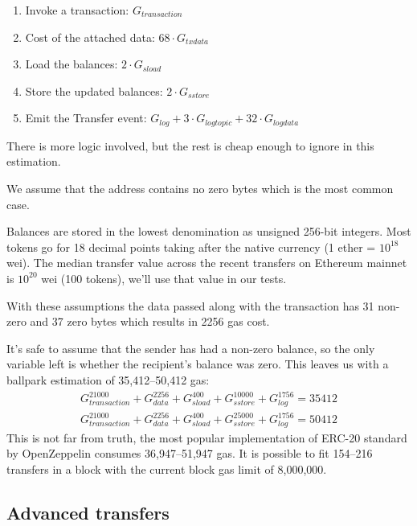 \documentclass[12pt]{article}
\begin{document}
\begin{enumerate}
	\item Invoke a transaction: $G_{transaction}$
	\item Cost of the attached data: $68 \cdot G_{txdata}$
	\item Load the balances: $2 \cdot G_{sload}$
	\item Store the updated balances: $2 \cdot G_{sstore}$
	\item Emit the Transfer event: $G_{log} + 3 \cdot G_{logtopic} + 32 \cdot G_{logdata}$
\end{enumerate}

There is more logic involved, but the rest is cheap enough to ignore in this estimation.

We assume that the address contains no zero bytes which is the most common case.

Balances are stored in the lowest denomination as unsigned 256-bit integers.
Most tokens go for 18 decimal points taking after the native currency (1 ether = $10^{18}$ wei).
The median transfer value across the recent transfers on Ethereum mainnet is $10^{20}$ wei (100 tokens), we'll use that value in our tests.

With these assumptions the data passed along with the transaction has 31 non-zero and 37 zero bytes which results in 2256 gas cost.

It's safe to assume that the sender has had a non-zero balance, so the only variable left is whether the recipient's balance was zero. This leaves us with a ballpark estimation of 35,412--50,412 gas:
\begin{gather}
	G_{transaction}^{21000} + G_{data}^{2256} + G_{sload}^{400} + G_{sstore}^{10000} + G_{log}^{1756} = 35412 \\
	G_{transaction}^{21000} + G_{data}^{2256} + G_{sload}^{400} + G_{sstore}^{25000} + G_{log}^{1756} = 50412
\end{gather}
%
This is not far from truth, the most popular implementation of ERC-20 standard by  OpenZeppelin\cite{openzeppelin} consumes 36,947--51,947 gas.
It is possible to fit 154--216 transfers in a block with the current block gas limit of  8,000,000.


\subsection{Advanced transfers}
\end{document}
